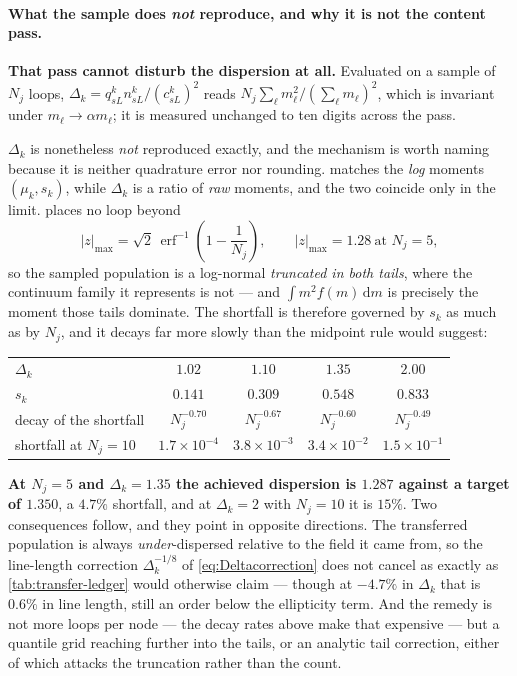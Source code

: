 \documentclass{article}
\begin{document}
\paragraph{What the sample does \emph{not} reproduce, and why it is not the
content pass.} \textbf{That pass cannot disturb the dispersion at all.}
Evaluated on a sample of $N_j$ loops, $\Delta_k=q^k_{sL}n^k_{sL}/(c^k_{sL})^2$
reads $N_j\sum_\ell m_\ell^{2}/(\sum_\ell m_\ell)^{2}$, which is invariant under
$m_\ell\to\alpha m_\ell$; it is measured unchanged to ten digits across the pass.

$\Delta_k$ is nonetheless \emph{not} reproduced exactly, and the mechanism is
worth naming because it is neither quadrature error nor rounding.
 matches the \emph{log} moments $(\mu_k,s_k)$, while $\Delta_k$
is a ratio of \emph{raw} moments, and the two coincide only in the limit.
 places no loop beyond
\begin{equation}
  |z|_{\max}=\sqrt2\,\operatorname{erf}^{-1}\!\left(1-\frac{1}{N_j}\right),
  \qquad
  |z|_{\max}=1.28\ \text{at }N_j=5,
  \label{eq:Deltatrunc}
\end{equation}
so the sampled population is a log-normal \emph{truncated in both tails}, where
the continuum family it represents is not --- and $\int m^{2}f(m)\,\mathrm dm$ is
precisely the moment those tails dominate. The shortfall is therefore governed by
$s_k$ as much as by $N_j$, and it decays far more slowly than the midpoint rule
would suggest:
\begin{center}\small
\begin{tabular}{@{}lcccc@{}}
\toprule
$\Delta_k$ & $1.02$ & $1.10$ & $1.35$ & $2.00$\\
$s_k$ & $0.141$ & $0.309$ & $0.548$ & $0.833$\\
\midrule
decay of the shortfall & $N_j^{-0.70}$ & $N_j^{-0.67}$ & $N_j^{-0.60}$ & $N_j^{-0.49}$\\
shortfall at $N_j=10$ & $1.7\times10^{-4}$ & $3.8\times10^{-3}$ & $3.4\times10^{-2}$ & $1.5\times10^{-1}$\\
\bottomrule
\end{tabular}
\end{center}
\textbf{At $N_j=5$ and $\Delta_k=1.35$ the achieved dispersion is $1.287$ against
a target of $1.350$}, a $4.7\%$ shortfall, and at $\Delta_k=2$ with $N_j=10$ it
is $15\%$. Two consequences follow, and they point in opposite directions. The
transferred population is always \emph{under}-dispersed relative to the field it
came from, so the line-length correction $\Delta_k^{-1/8}$ of
\cref{eq:Deltacorrection} does not cancel as exactly as
\cref{tab:transfer-ledger} would otherwise claim --- though at $-4.7\%$ in
$\Delta_k$ that is $0.6\%$ in line length, still an order below the ellipticity
term. And the remedy is not more loops per node --- the decay rates above make
that expensive --- but a quantile grid reaching further into the tails, or an
analytic tail correction, either of which attacks the truncation rather than the
count.
\end{document}
